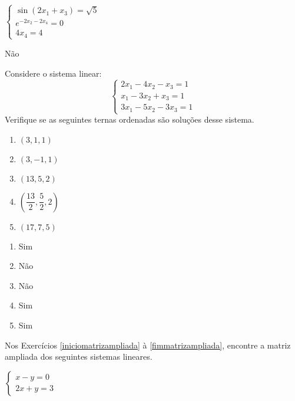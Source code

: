 \documentclass[12pt]{exam}
\begin{document}
\begin{exercicio}\label{fimsistemalinearsimples}
    $\begin{cases} \sin(2x_1 + x_3) = \sqrt{5}\\ e^{-2x_2 - 2x_4} = 0\\ 4x_4 = 4\end{cases}$
    \begin{solucao}
        Não
    \end{solucao}
\end{exercicio}

\begin{exercicio}
  Considere o sistema linear:
  \[
    \begin{cases}
      2x_1 - 4x_2 - x_3 = 1\\
      x_1 - 3x_2 + x_3 = 1\\
      3x_1 - 5x_2 - 3x_3 = 1
    \end{cases}
  \]
  Verifique se as seguintes ternas ordenadas são soluções desse sistema.
  \begin{enumerate}[label={\alph*})]
    \item $(3,1,1)$
    \item $(3,-1,1)$
    \item $(13, 5, 2)$
    \item $\left(\dfrac{13}{2}, \dfrac{5}{2}, 2\right)$
    \item $(17,7,5)$
  \end{enumerate}
  \begin{solucao}
    \begin{enumerate}[label={\alph*})]
      \item Sim
      \item Não
      \item Não
      \item Sim
      \item Sim
    \end{enumerate}
  \end{solucao}
\end{exercicio}

Nos Exercícios \ref{iniciomatrizampliada} à \ref{fimmatrizampliada}, encontre a matriz ampliada dos seguintes sistemas lineares.

\begin{exercicio}\label{iniciomatrizampliada}
    $\begin{cases}x - y = 0\\2x + y = 3\end{cases}$
\end{exercicio}
\end{document}
